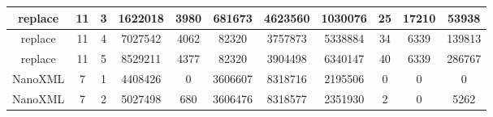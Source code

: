\begin{table*}[]
\begin{tabular}{@{}ccccccccccc@{}}
        replace                                                  & 11                                                         & 3    & 1622018                                                     & 3980                                                                      & 681673                                                  & 4623560                                                    & 1030076                                                        & 25                                                        & 17210                                                     & 53938   \\ \midrule
        replace                                                  & 11                                                         & 4    & 7027542                                                     & 4062                                                                      & 82320                                                   & 3757873                                                    & 5338884                                                        & 34                                                        & 6339                                                      & 139813  \\ \midrule
        replace                                                  & 11                                                         & 5    & 8529211                                                     & 4377                                                                      & 82320                                                   & 3904498                                                    & 6340147                                                        & 40                                                        & 6339                                                      & 286767  \\ \midrule
        NanoXML                                                  & 7                                                          & 1    & 4408426                                                     & 0                                                                         & 3606607                                                 & 8318716                                                    & 2195506                                                        & 0                                                         & 0                                                         & 0       \\ \midrule
        NanoXML                                                  & 7                                                          & 2    & 5027498                                                     & 680                                                                       & 3606476                                                 & 8318577                                                    & 2351930                                                        & 2                                                         & 0                                                         & 5262    \\ \midrule

\end{tabular}
\end{table*}
